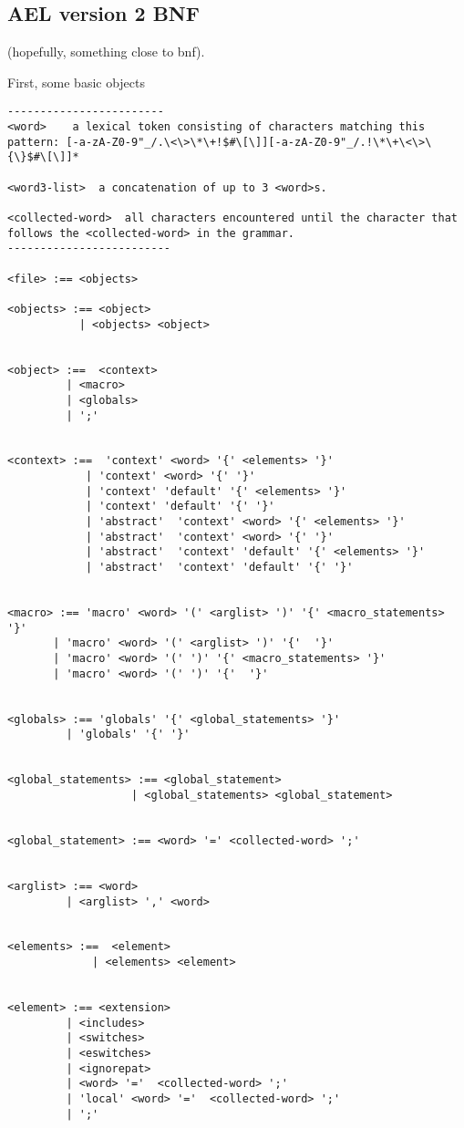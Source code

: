 {\subsection{AEL version 2 BNF}

(hopefully, something close to bnf).

First, some basic objects

\begin{verbatim}
------------------------
<word>    a lexical token consisting of characters matching this pattern: [-a-zA-Z0-9"_/.\<\>\*\+!$#\[\]][-a-zA-Z0-9"_/.!\*\+\<\>\{\}$#\[\]]*

<word3-list>  a concatenation of up to 3 <word>s.

<collected-word>  all characters encountered until the character that follows the <collected-word> in the grammar.
-------------------------

<file> :== <objects>

<objects> :== <object>
           | <objects> <object>


<object> :==  <context>
         | <macro>
         | <globals>
         | ';'


<context> :==  'context' <word> '{' <elements> '}'
            | 'context' <word> '{' '}'
            | 'context' 'default' '{' <elements> '}'
            | 'context' 'default' '{' '}'
            | 'abstract'  'context' <word> '{' <elements> '}'
            | 'abstract'  'context' <word> '{' '}'
            | 'abstract'  'context' 'default' '{' <elements> '}'
            | 'abstract'  'context' 'default' '{' '}'


<macro> :== 'macro' <word> '(' <arglist> ')' '{' <macro_statements> '}'
       | 'macro' <word> '(' <arglist> ')' '{'  '}'
       | 'macro' <word> '(' ')' '{' <macro_statements> '}'
       | 'macro' <word> '(' ')' '{'  '}'


<globals> :== 'globals' '{' <global_statements> '}'
         | 'globals' '{' '}'


<global_statements> :== <global_statement>
                   | <global_statements> <global_statement>


<global_statement> :== <word> '=' <collected-word> ';'


<arglist> :== <word>
         | <arglist> ',' <word>


<elements> :==  <element>
             | <elements> <element>


<element> :== <extension>
         | <includes>
         | <switches>
         | <eswitches>
         | <ignorepat>
         | <word> '='  <collected-word> ';'
         | 'local' <word> '='  <collected-word> ';'
         | ';'



\end{verbatim}}
